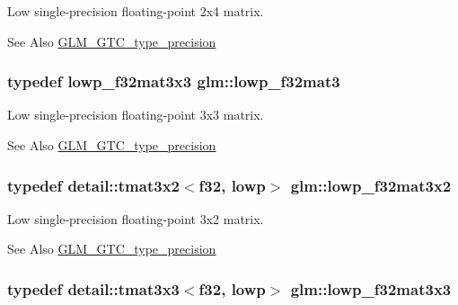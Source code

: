 Low single-\/precision floating-\/point 2x4 matrix. \begin{DoxySeeAlso}{See Also}
\hyperlink{group__gtc__type__precision}{G\-L\-M\-\_\-\-G\-T\-C\-\_\-type\-\_\-precision} 
\end{DoxySeeAlso}
\hypertarget{group__gtc__type__precision_ga84500ab23c0f0f3c585f8ad02f33b88c}{
\subsubsection[{lowp\-\_\-f32mat3}]{\setlength{\rightskip}{0pt plus 5cm}typedef lowp\-\_\-f32mat3x3 {\bf glm\-::lowp\-\_\-f32mat3}}}\label{group__gtc__type__precision_ga84500ab23c0f0f3c585f8ad02f33b88c}
Low single-\/precision floating-\/point 3x3 matrix. \begin{DoxySeeAlso}{See Also}
\hyperlink{group__gtc__type__precision}{G\-L\-M\-\_\-\-G\-T\-C\-\_\-type\-\_\-precision} 
\end{DoxySeeAlso}
\hypertarget{group__gtc__type__precision_gadf8ee4630e8d2b6ae72293a7c8dff497}{
\subsubsection[{lowp\-\_\-f32mat3x2}]{\setlength{\rightskip}{0pt plus 5cm}typedef detail\-::tmat3x2$<$f32, lowp$>$ {\bf glm\-::lowp\-\_\-f32mat3x2}}}\label{group__gtc__type__precision_gadf8ee4630e8d2b6ae72293a7c8dff497}
Low single-\/precision floating-\/point 3x2 matrix. \begin{DoxySeeAlso}{See Also}
\hyperlink{group__gtc__type__precision}{G\-L\-M\-\_\-\-G\-T\-C\-\_\-type\-\_\-precision} 
\end{DoxySeeAlso}
\hypertarget{group__gtc__type__precision_ga92f4b130a9651c69361600272f113542}{
\subsubsection[{lowp\-\_\-f32mat3x3}]{\setlength{\rightskip}{0pt plus 5cm}typedef detail\-::tmat3x3$<$f32, lowp$>$ {\bf glm\-::lowp\-\_\-f32mat3x3}}}\label{group__gtc__type__precision_ga92f4b130a9651c69361600272f113542}
